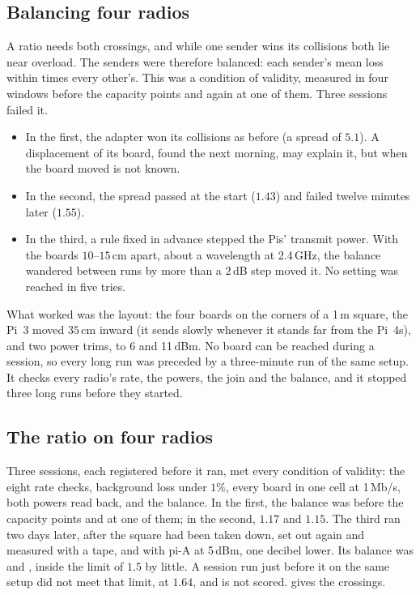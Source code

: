 \subsection{Balancing four radios}\label{sec:balance-hw}

A ratio needs both crossings, and while one sender wins its collisions both lie near overload.
The senders were therefore balanced: each sender's mean loss within \hwSpreadMax{} times every
other's. This was a condition of validity, measured in four windows before the capacity points
and again at one of them. Three sessions failed it.
\begin{itemize}
\item In the first, the adapter won its collisions as before (a spread of $5.1$). A displacement of
      its board, found the next morning, may explain it, but when the board moved is not known.
\item In the second, the spread passed at the start ($1.43$) and failed twelve minutes later
      ($1.55$).
\item In the third, a rule fixed in advance stepped the Pis' transmit power. With the boards
      $10$--$15$\,cm apart, about a wavelength at 2.4\,GHz, the balance wandered between runs by
      more than a $2$\,dB step moved it. No setting was reached in five tries.
\end{itemize}
What worked was the layout: the four boards on the corners of a 1\,m square, the Pi~3 moved
$35$\,cm inward (it sends slowly whenever it stands far from the Pi~4s), and two power trims, to
6 and 11\,dBm. No board can be reached during a session, so every long run was preceded by a
three-minute run of the same setup. It checks every radio's rate, the powers, the join and the
balance, and it stopped three long runs before they started.

\subsection{The ratio on four radios}\label{sec:ratio-hw}

Three sessions, each registered before it ran, met every condition of validity: the eight rate
checks, background loss under $1\%$, every board in one cell at 1\,Mb/s, both powers read back,
and the balance. In the first, the balance was \hwRatioGate{} before the capacity points and
\hwRatioSpread{} at one of them; in the second, $1.17$ and $1.15$. The third ran two days later,
after the square had been taken down, set out again and measured with a tape, and with pi-A at
5\,dBm, one decibel lower. Its balance was \hwThirdGate{} and \hwThirdSpread, inside the limit of
$1.5$ by little. A session run just before it on the same setup did not meet that limit, at $1.64$,
and is not scored.  gives the crossings.


